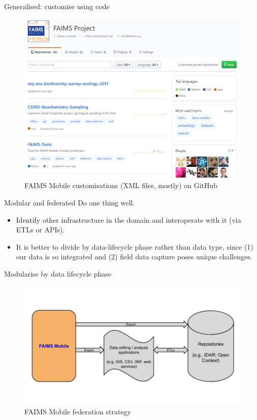 \documentclass[aspectratio=169, 12pt]{beamer} %
\begin{document}
\begin{frame}{Generalised: customise using code}
 \begin{figure}[H]
    \centering
        \includegraphics[height=.75\textheight]{figures/FAIMS-generalised.png}
        \caption{FAIMS Mobile customisations (XML files, mostly) on GitHub}
        \label{fig:figure11}
 \end{figure}
\end{frame}

\begin{frame}{Modular and federated}
  Do one thing well.
      \begin{itemize}[label=\textbullet]
        \item Identify other infrastructure in the domain and interoperate with it (via ETLs or APIs).
        \item It is better to divide by data-lifecycle phase rather than data type, since (1) our data is so integrated and (2) field data capture poses unique challenges.
    \end{itemize}
\end{frame}

\begin{frame}{Modularise by data lifecycle phase}
 \begin{figure}[H]
    \centering
        \includegraphics[height=.75\textheight]{figures/FAIMS-federation.png}
        \caption{FAIMS Mobile federation strategy}
        \label{fig:figure13}
 \end{figure}
\end{frame}
\end{document}
